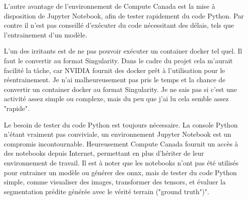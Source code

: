 \par L'autre avantage de l'environnement de Compute Canada est la mise à disposition de Jupyter Notebook, afin de tester rapidement du code Python. Par contre il n'est pas conseillé d'exécuter du code nécessitant des délais, tels que l'entrainement d'un modèle. 
\par L'un des irritants est de ne pas pouvoir exécuter un container docker tel quel. Il faut le convertir au format Singularity. Dans le cadre du projet cela m'aurait facilité la tâche, car NVIDIA fournit des docker prêt à l'utilisation pour le réentrainement. Je n'ai malheureusement pas pris le temps et la chance de convertir un container docker au format Singularity. Je ne sais pas si c'est une activité assez simple ou complexe, mais du peu que j'ai lu cela semble assez "rapide".
\par Le besoin de tester du code Python est toujours nécessaire. La console Python n'étant vraiment pas conviviale, un environnement Jupyter Notebook est un compromis incontournable. Heureusement Compute Canada fournit un accès à des notebooks depuis Internet, permettant en plus d'hériter de leur environnement de travail. Il est à noter que les notebooks n'ont pas été utilisés pour entrainer un modèle ou générer des onnx, mais de tester du code Python simple, comme visualiser des images, transformer des tensors, et évaluer la segmentation prédite générée avec le vérité terrain ("ground truth")". 

